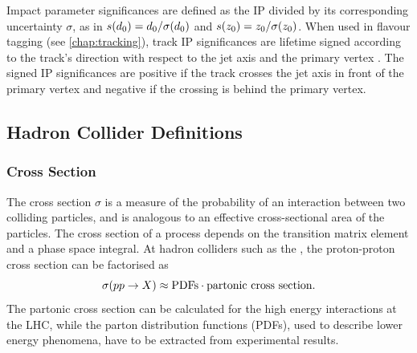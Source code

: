 Impact parameter significances are defined as the IP divided by its corresponding uncertainty $\sigma$, as in $\dzerosig = d_0 / \dzerouncert$ and $\zzerosig = z_0 / \zzerouncert$.
When used in flavour tagging (see \cref{chap:tracking}), track IP significances are lifetime signed according to the track's direction with respect to the jet axis and the primary vertex \cite{PERF-2012-04}.
The signed IP significances are positive if the track crosses the jet axis in front of the primary vertex and negative if the crossing is behind the primary vertex.


\subsection{Hadron Collider Definitions}\label{sec:collider_defs}

\subsubsection{Cross Section}
The cross section $\sigma$ is a measure of the probability of an interaction between two colliding particles, and is analogous to an effective cross-sectional area of the particles.
The cross section of a process depends on the transition matrix element and a phase space integral.
At hadron colliders such as the \LHC, the proton-proton cross section can be factorised as 
%
\begin{equation}
  \sigma(pp \to X) \approx \textnormal{PDFs} \cdot \textnormal{partonic cross section} .
\end{equation}
%
The partonic cross section can be calculated for the high energy interactions at the LHC, while the parton distribution functions (PDFs), used to describe lower energy phenomena, have to be extracted from experimental results. 

